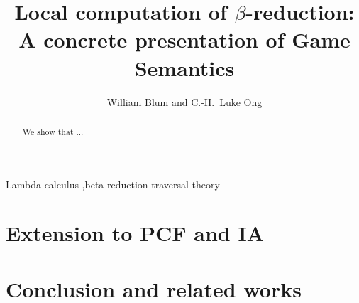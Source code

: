 \documentclass[preprint,11pt,draft]{elsarticle}
\begin{document}
\begin{keyword}
Lambda calculus \sep beta-reduction
traversal theory
\end{keyword}
\begin{frontmatter}
\title{Local computation of $\beta$-reduction:\\A concrete presentation of Game Semantics}
\author{William Blum and C.-H.~Luke Ong}
\address{Oxford University Computing Laboratory}
\begin{abstract}
We show that ...
\end{abstract}
\end{frontmatter}

\tableofcontents \bigskip

\listoftodos
\bigskip

    

    \section{Extension to PCF and IA}
    

    \section{Conclusion and related works}
    




\end{document}
